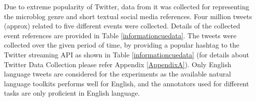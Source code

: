 

Due to extreme popularity of Twitter, data from it was collected for representing the microblog genre and short textual social media references. Four million tweets (approx) related to five different events were collected. Details of the collected event references are provided in Table \ref{informationcuedata}. The tweets were collected over the given period of time, by providing a popular hashtag to the Twitter streaming API  as shown in Table \ref{informationcuedata} (for details about Twitter Data Collection please refer Appendix \ref{AppendixA}). Only English language tweets are considered for the experiments as the available natural language toolkits performs well for English, and the annotators used for different tasks are only proficient in English language.

